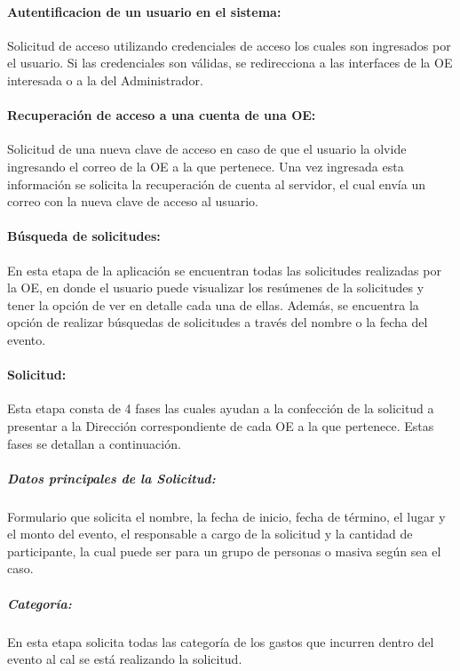 
\paragraph{Autentificacion de un usuario en el sistema: } Solicitud de acceso utilizando credenciales de acceso los cuales son ingresados por el usuario. Si las credenciales son válidas, se redirecciona a las interfaces de la OE interesada o a la del Administrador.

\paragraph{Recuperación de acceso a una cuenta de una OE: } Solicitud de una nueva clave de acceso en caso de que el usuario la olvide ingresando el correo de la OE a la que pertenece. Una vez ingresada esta información se solicita la recuperación de cuenta al servidor, el cual envía un correo con la nueva clave de acceso al usuario.

\paragraph{Búsqueda de solicitudes: } En esta etapa de la aplicación se encuentran todas las solicitudes realizadas por la OE, en donde el usuario puede visualizar los resúmenes de la solicitudes y tener la opción de ver en detalle cada una de ellas. Además, se encuentra la opción de realizar búsquedas de solicitudes a través del nombre o la fecha del evento.

\paragraph{Solicitud: }Esta etapa consta de 4 fases las cuales ayudan a la confección de la solicitud a presentar a la Dirección correspondiente de cada OE a la que pertenece. Estas fases se detallan a continuación. 

    \subparagraph{Datos principales de la Solicitud: } Formulario que solicita el nombre, la fecha de inicio, fecha de término, el lugar y el monto del evento, el responsable a cargo de la solicitud y la cantidad de participante, la cual puede ser para un grupo de personas o masiva según sea el caso.

    \subparagraph{Categoría: } En esta etapa solicita todas las categoría de los gastos que incurren dentro del evento al cal se está realizando la solicitud.

